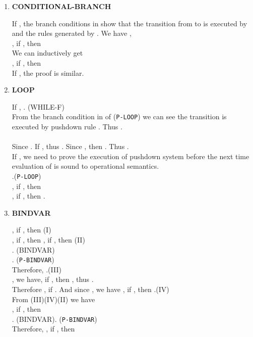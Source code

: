 \documentclass{llncs}
\begin{document}
{\begin{enumerate}[1.]
\hfill (II)\\
, if , then \\
 (I) \\
, if , then
\hfill (III)\\
 (III) \\
, if ,
then \hfill (IV)\\
 (IV) \\
, if , then .

\item \textbf{CONDITIONAL-BRANCH}

If , the branch conditions in
 show that the transition from  to  is executed by
 and the rules
generated by . We have
,\\
,
if , then
\\
We can inductively get\\
, if , then \\
If , the proof is similar.

\item \textbf{LOOP}

If ,
. (WHILE-F)\\
From the branch condition in  of (\texttt{P-LOOP}) we can see the
transition is executed by pushdown rule . Thus
.\\
\\
Since . If ,
thus . Since , then
. Thus
.\\
If , we need to prove the
execution of pushdown system before the next time evaluation of 
is sound to operational semantics.\\
.(\texttt{P-LOOP})\\
,
if , then
\\
, if , then .

\item \textbf{BINDVAR}

, if , then \hfill (I)\\
, if , then , if , then \hfill(II)\\
. (BINDVAR)\\
.
(\texttt{P-BINDVAR})\\
Therefore, .\hfill(III)\\
, we have, if , then , thus .\\
Therefore , if . And
since , we have , if , then
.\hfill(IV)\\
From (III)(IV)(II) we have\\
, if , then \\
. (BINDVAR)\qquad . (\texttt{P-BINDVAR})\\
Therefore, , if , then 


\end{enumerate}}
\end{document}
